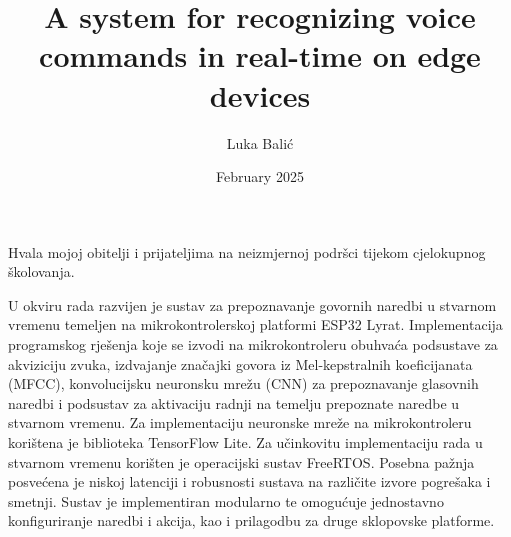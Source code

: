 \documentclass[diplomskirad]{fer}
\title{A system for recognizing voice commands in real-time on edge devices}
\author{Luka Balić}
\date{February 2025}
\begin{document}
\maketitle






\begin{zahvale}
  Hvala mojoj obitelji i prijateljima na neizmjernoj podršci tijekom cjelokupnog školovanja.
\end{zahvale}


\mainmatter


\tableofcontents

%








\begingroup
\small

\endgroup



\begin{sazetak}
U okviru rada razvijen je sustav za prepoznavanje govornih naredbi u stvarnom vremenu
temeljen na mikrokontrolerskoj platformi ESP32 Lyrat. Implementacija programskog
rješenja koje se izvodi na mikrokontroleru obuhvaća podsustave za akviziciju zvuka, 
izdvajanje značajki govora iz Mel-kepstralnih koeficijanata (MFCC), 
konvolucijsku neuronsku mrežu (CNN) za prepoznavanje glasovnih naredbi
i podsustav za aktivaciju radnji na temelju prepoznate naredbe u stvarnom vremenu.
Za implementaciju neuronske mreže na mikrokontroleru korištena je biblioteka 
TensorFlow Lite. Za učinkovitu implementaciju rada u stvarnom vremenu korišten 
je operacijski sustav FreeRTOS. Posebna pažnja posvećena je niskoj latenciji
i robusnosti sustava na različite izvore pogrešaka i smetnji. Sustav je implementiran modularno te omogućuje jednostavno konfiguriranje naredbi i akcija, kao i prilagodbu za druge sklopovske platforme.
\end{sazetak}
\end{document}
